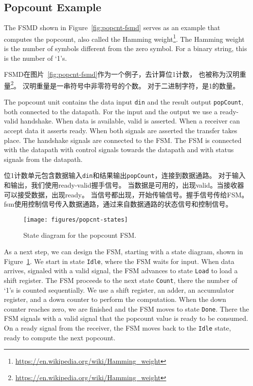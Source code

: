 \documentclass[%
    10pt,
    headinclude, footexclude,
    openright, %
    notitlepage,
    cleardoubleempty,
    headsepline,
    pointlessnumbers,
    bibtotoc, idxtotoc,
    ]{scrbook}
\newcommand{\code}[1]{{\small{\texttt{#1}}}}
\newcommand{\scale}{0.7}
\newcommand{\myref}[2]{\href{#1}{#2}}
\renewcommand{\myref}[2]{{#2}{\footnote{\url{#1}}}}
\begin{document}
\subsection{Popcount Example}

The FSMD shown in Figure~\ref{fig:popcnt-fsmd} serves as an example that computes the
popcount, also called the \myref{https://en.wikipedia.org/wiki/Hamming_weight}{Hamming weight}.
The Hamming weight is the number of symbols different from the zero symbol.
For a binary string, this is the number of `1's.

FSMD在图片~\ref{fig:popcnt-fsmd}作为一个例子，去计算位1计数，
也被称为\myref{https://en.wikipedia.org/wiki/Hamming_weight}{汉明重量}。
汉明重量是一串符号中非零符号的个数。
对于二进制字符，是1的数量。

The popcount unit contains the data input \code{din} and the result output \code{popCount},
both connected to the datapath. For the input and the output we use a ready-valid handshake.
When data is available, valid is asserted. When a receiver can accept data it asserts ready.
When both signals are asserted the transfer takes place. The handshake signals are connected
to the FSM. The FSM is connected with the datapath with control signals towards the datapath
and with status signals from the datapath.

位1计数单元包含数据输入\code{din}和结果输出\code{popCount}，连接到数据通路。
对于输入和输出，我们使用ready-valid握手信号。
当数据是可用的，出现valid。当接收器可以接受数据，出现ready。
当信号都出现，开始传输信号。握手信号传给FSM。
fsm使用控制信号传入数据通路，通过来自数据通路的状态信号和控制信号。

\begin{figure}
  \centering
  \texttt{[image: figures/popcnt-states]}
  \caption{State diagram for the popcount FSM.}
  \label{fig:popcnt-states}
\end{figure}

As a next step, we can design the FSM, starting with a state diagram, shown in
Figure~\ref{fig:popcnt-states}. We start in state \code{Idle}, where the FSM waits
for input. When data arrives, signaled with a valid signal, the FSM advances to state \code{Load}
to load a shift register. The FSM proceeds to the next state \code{Count}, there the number
of `1's is counted sequentially. We use a shift register, an adder, an accumulator
register, and a down counter to perform the computation. When the down counter reaches
zero, we are finished and the FSM moves to state \code{Done}. There the FSM signals with a valid
signal that the popcount value is ready to be consumed. On a ready signal from the
receiver, the FSM moves back to the \code{Idle} state, ready to compute the next popcount.
\end{document}
